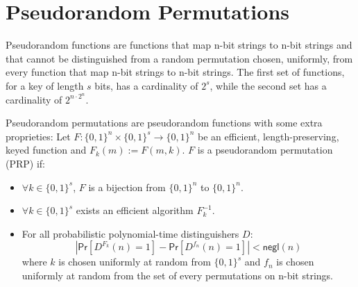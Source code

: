 \section{Pseudorandom Permutations}
Pseudorandom functions are functions that map n-bit strings to n-bit strings and that cannot be distinguished from a random permutation chosen, uniformly, from every function that map n-bit strings to n-bit strings.
The first set of functions, for a key of length $s$ bits, has a cardinality of $2^{s}$, while the second set has a cardinality of $2^{n\cdot2^n}$.\par
Pseudorandom permutations are pseudorandom functions with some extra proprieties:
Let $F : \{0,1\}^{n} \times \{0,1\}^{s} \rightarrow \{0,1\}^{n}$ be an efficient, length-preserving, keyed function and $F_k(m) := F(m, k)$.
$F$ is a pseudorandom permutation (PRP) if:
\begin{itemize}
    \item{$\forall k \in \{0,1\}^{s}$, $F$ is a bijection from $\{0,1\}^{n}$ to $\{0,1\}^{n}$}.
    \item{$\forall k \in \{0,1\}^{s}$ exists an efficient algorithm $F^{-1}_k$.}
    \item{For all probabilistic polynomial-time distinguishers $D$:
        $$
            |\mathsf{Pr}[D^{F_k}(n) = 1] - \mathsf{Pr}[D^{f_n}(n) = 1]| < \mathsf{negl}(n)
        $$
        where $k$ is chosen uniformly at random from $\{0,1\}^{s}$ and $f_n$ is chosen uniformly at random from the set of every permutations on n-bit strings.
        }
\end{itemize}

